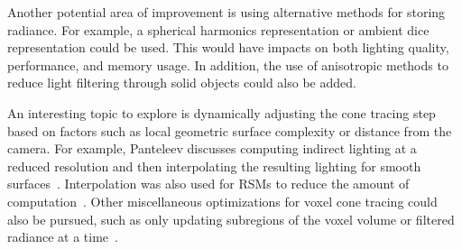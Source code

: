 Another potential area of improvement is using alternative methods for storing radiance. For example, a spherical harmonics representation or ambient dice~\cite{iwanicki2017ambient} representation could be used. This would have impacts on both lighting quality, performance, and memory usage. In addition, the use of anisotropic methods to reduce light filtering through solid objects could also be added.

An interesting topic to explore is dynamically adjusting the cone tracing step based on factors such as local geometric surface complexity or distance from the camera. For example, Panteleev discusses computing indirect lighting at a reduced resolution and then interpolating the resulting lighting for smooth surfaces~\cite{practicalvxgi}. Interpolation was also used for RSMs to reduce the amount of computation~\cite{Dachsbacher:2005:RSM:1053427.1053460}. Other miscellaneous optimizations for voxel cone tracing could also be pursued, such as only updating subregions of the voxel volume or filtered radiance at a time~\cite{mclaren2016cascaded}.